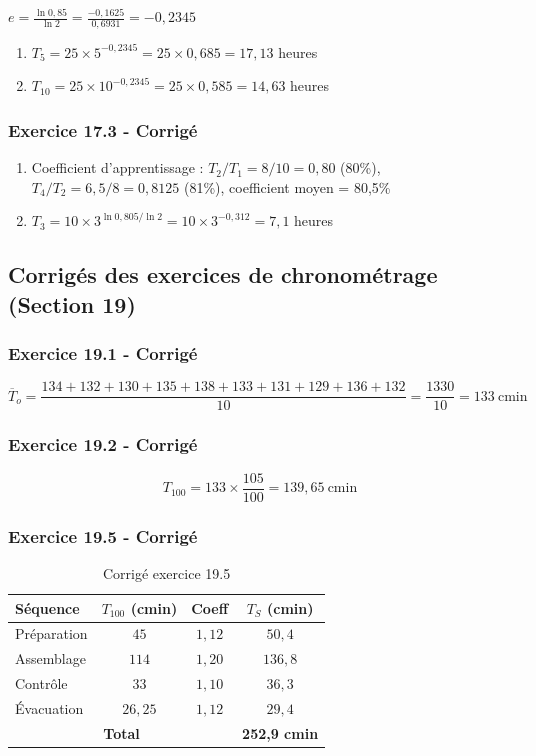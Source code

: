 \documentclass[a4paper,12pt]{article}
\begin{document}
$e = \frac{\ln 0,85}{\ln 2} = \frac{-0,1625}{0,6931} = -0,2345$

\begin{enumerate}
    \item $T_5 = 25 \times 5^{-0,2345} = 25 \times 0,685 = 17,13$ heures
    \item $T_{10} = 25 \times 10^{-0,2345} = 25 \times 0,585 = 14,63$ heures
\end{enumerate}

\subsubsection{Exercice 17.3 - Corrigé}

\begin{enumerate}
    \item Coefficient d'apprentissage : $T_2/T_1 = 8/10 = 0,80$ (80\%), $T_4/T_2 = 6,5/8 = 0,8125$ (81\%), coefficient moyen = 80,5\%
    \item $T_3 = 10 \times 3^{\ln 0,805 / \ln 2} = 10 \times 3^{-0,312} = 7,1$ heures
\end{enumerate}

\subsection{Corrigés des exercices de chronométrage (Section 19)}

\subsubsection{Exercice 19.1 - Corrigé}

\[
\overline{T}_o = \frac{134+132+130+135+138+133+131+129+136+132}{10} = \frac{1330}{10} = 133\ \text{cmin}
\]

\subsubsection{Exercice 19.2 - Corrigé}

\[
T_{100} = 133 \times \frac{105}{100} = 139,65\ \text{cmin}
\]

\subsubsection{Exercice 19.5 - Corrigé}

\begin{table}[ht]
\centering
\begin{tabular}{|l|c|c|c|}
\hline
\textbf{Séquence} & $T_{100}$ (cmin) & \textbf{Coeff} & $T_S$ (cmin) \\
\hline
Préparation & $45$ & $1,12$ & $50,4$ \\
Assemblage & $114$ & $1,20$ & $136,8$ \\
Contrôle & $33$ & $1,10$ & $36,3$ \\
Évacuation & $26,25$ & $1,12$ & $29,4$ \\
\hline
\multicolumn{3}{|c|}{\textbf{Total}} & \textbf{252,9 cmin} \\
\hline
\end{tabular}
\caption{Corrigé exercice 19.5}
\end{table}
\end{document}
